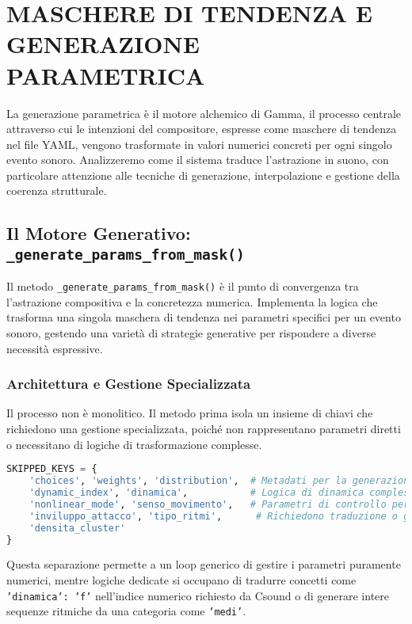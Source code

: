 
\section{MASCHERE DI TENDENZA E GENERAZIONE PARAMETRICA}
La generazione parametrica è il motore alchemico di Gamma, il processo centrale attraverso cui le intenzioni del compositore, espresse come  maschere di tendenza  nel file YAML, vengono trasformate in valori numerici concreti per ogni singolo evento sonoro. Analizzeremo come il sistema traduce l'astrazione in suono, con particolare attenzione alle tecniche di generazione, interpolazione e gestione della coerenza strutturale.
\subsection{Il Motore Generativo: \texttt{\_generate\_params\_from\_mask()}}
Il metodo \texttt{\_generate\_params\_from\_mask()} è il punto di convergenza tra l'astrazione compositiva e la concretezza numerica. Implementa la logica che trasforma una singola maschera di tendenza nei parametri specifici per un evento sonoro, gestendo una varietà di strategie generative per rispondere a diverse necessità espressive.
\subsubsection{Architettura e Gestione Specializzata}
Il processo non è monolitico. Il metodo prima isola un insieme di chiavi che richiedono una gestione specializzata, poiché non rappresentano parametri diretti o necessitano di logiche di trasformazione complesse.

\begin{lstlisting}[language=Python]
SKIPPED_KEYS = {
    'choices', 'weights', 'distribution',  # Metadati per la generazione
    'dynamic_index', 'dinamica',           # Logica di dinamica complessa
    'nonlinear_mode', 'senso_movimento',   # Parametri di controllo per Csound
    'inviluppo_attacco', 'tipo_ritmi',      # Richiedono traduzione o generazione complessa
    'densita_cluster'                      
}
\end{lstlisting}
Questa separazione permette a un loop generico di gestire i parametri puramente numerici, mentre logiche dedicate si occupano di tradurre concetti come \texttt{'dinamica': 'f'} nell'indice numerico richiesto da Csound o di generare intere sequenze ritmiche da una categoria come \texttt{'medi'}.

